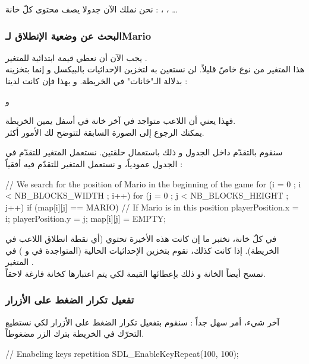نحن نملك الآن جدولا
يصف محتوى كلّ خانة : 
، ، \dots

\subsubsection{البحث عن وضعية الإنطلاق لـ\textenglish{Mario}}

يجب الآن أن نعطي قيمة ابتدائية للمتغير
.\\
هذا المتغير من نوع
خاصّ قليلاً. لن نستعين به لتخزين الإحداثيات بالبيكسل و إنما بتخزينه بدلالة الـ"خانات" في الخريطة. و بهذا فإن كانت لدينا :

و

فهذا يعني أن اللاعب متواجد في آخر خانة في أسفل يمين الخريطة.\\
يمكنك الرجوع إلى الصورة السابقة لتتوضح لك الأمور أكثر.

سنقوم بالتقدّم داخل الجدول
و ذلك باستعمال حلقتين. نستعمل المتغير
للتقدّم في الجدول عمودياً، و نستعمل المتغير
للتقدّم فيه أفقياً :

\begin{Csource}
// We search for the position of Mario in the beginning of the game
for (i = 0 ; i < NB_BLOCKS_WIDTH ; i++)
{
	for (j = 0 ; j < NB_BLOCKS_HEIGHT ; j++)
	{
		if (map[i][j] == MARIO) // If Mario is in this position
		{
			playerPosition.x = i;
			playerPosition.y = j;
			map[i][j] = EMPTY;
		}
	}
}
\end{Csource}

في كلّ خانة، نختبر ما إن كانت هذه الأخيرة تحتوي
(أي نقطة انطلاق اللاعب في الخريطة). إذا كانت كذلك، نقوم بتخزين الإحداثيات الحالية (المتواجدة في 
و
)
في المتغير
.\\
نمسح أيضاً الخانة و ذلك بإعطائها القيمة
لكي يتم اعتبارها كخانة فارغة لاحقاً.

\subsubsection{تفعيل تكرار الضغط على الأزرار}

آخر شيء، أمر سهل جداً : سنقوم بتفعيل تكرار الضغط على الأزرار لكي نستطيع التحرّك في الخريطة بترك الزر مضغوطاً.

\begin{Csource}
// Enabeling keys repetition
SDL_EnableKeyRepeat(100, 100);
\end{Csource}

